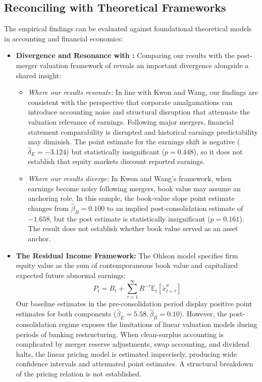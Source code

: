 \subsection{Reconciling with Theoretical Frameworks}
The empirical findings can be evaluated against foundational theoretical models in accounting and financial economics:
\begin{itemize}
    \item \textbf{Divergence and Resonance with \citet{kwon2020}:}
    Comparing our results with the post-merger valuation framework of \citet{kwon2020} reveals an important divergence alongside a shared insight:
    \begin{itemize}
        \item \textit{Where our results resonate:} In line with Kwon and Wang, our findings are consistent with the perspective that corporate amalgamations can introduce accounting noise and structural disruption that attenuate the valuation relevance of earnings. Following major mergers, financial statement comparability is disrupted and historical earnings predictability may diminish. The point estimate for the earnings shift is negative ($\hat{\delta}_E = -3.124$) but statistically insignificant ($p = 0.448$), so it does not establish that equity markets discount reported earnings.
        \item \textit{Where our results diverge:} In Kwon and Wang's framework, when earnings become noisy following mergers, book value may assume an anchoring role. In this sample, the book-value slope point estimate changes from $\hat{\beta}_B=0.100$ to an implied post-consolidation estimate of $-1.658$, but the post estimate is statistically insignificant ($p=0.161$). The result does not establish whether book value served as an asset anchor.
    \end{itemize}
    \item \textbf{The \citet{ohlson1995} Residual Income Framework:}
    The Ohlson model specifies firm equity value as the sum of contemporaneous book value and capitalized expected future abnormal earnings:
    \begin{equation}
    P_t = B_t + \sum_{\tau=1}^{\infty} R^{-\tau} \mathbb{E}_t [\tilde{x}_{t+\tau}^a]
    \end{equation}
    Our baseline estimates in the pre-consolidation period display positive point estimates for both components ($\hat{\beta}_E = 5.58, \hat{\beta}_B = 0.10$). However, the post-consolidation regime exposes the limitations of linear valuation models during periods of banking restructuring. When clean-surplus accounting is complicated by merger reserve adjustments, swap accounting, and dividend halts, the linear pricing model is estimated imprecisely, producing wide confidence intervals and attenuated point estimates. A structural breakdown of the pricing relation is not established.

\end{itemize}
